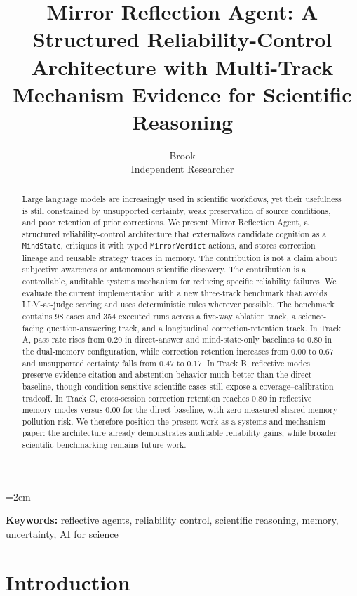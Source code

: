 \documentclass[12pt]{article}
\title{\textbf{Mirror Reflection Agent: A Structured Reliability-Control Architecture with Multi-Track Mechanism Evidence for Scientific Reasoning}}
\author{Brook \\ Independent Researcher}
\date{}
\begin{document}
\maketitle
\onehalfspacing
\emergencystretch=2em

\begin{abstract}
Large language models are increasingly used in scientific workflows, yet their usefulness is still constrained by unsupported certainty, weak preservation of source conditions, and poor retention of prior corrections. We present Mirror Reflection Agent, a structured reliability-control architecture that externalizes candidate cognition as a \texttt{MindState}, critiques it with typed \texttt{MirrorVerdict} actions, and stores correction lineage and reusable strategy traces in memory. The contribution is not a claim about subjective awareness or autonomous scientific discovery. The contribution is a controllable, auditable systems mechanism for reducing specific reliability failures. We evaluate the current implementation with a new three-track benchmark that avoids LLM-as-judge scoring and uses deterministic rules wherever possible. The benchmark contains 98 cases and 354 executed runs across a five-way ablation track, a science-facing question-answering track, and a longitudinal correction-retention track. In Track A, pass rate rises from 0.20 in direct-answer and mind-state-only baselines to 0.80 in the dual-memory configuration, while correction retention increases from 0.00 to 0.67 and unsupported certainty falls from 0.47 to 0.17. In Track B, reflective modes preserve evidence citation and abstention behavior much better than the direct baseline, though condition-sensitive scientific cases still expose a coverage--calibration tradeoff. In Track C, cross-session correction retention reaches 0.80 in reflective memory modes versus 0.00 for the direct baseline, with zero measured shared-memory pollution risk. We therefore position the present work as a systems and mechanism paper: the architecture already demonstrates auditable reliability gains, while broader scientific benchmarking remains future work.
\end{abstract}

\noindent\textbf{Keywords:} reflective agents, reliability control, scientific reasoning, memory, uncertainty, AI for science

\section{Introduction}
\end{document}

